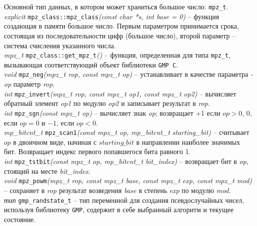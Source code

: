 \documentclass[a4paper,12pt]{article}
\begin{document}
	Основной тип данных, в котором может храниться большое число: \texttt{mpz\_t}.\\
	
	\textit{explicit} \texttt{mpz\_class::mpz\_class}\textit{(const char *s, int base = 0)} -- функция создающая в памяти большое число. Первым параметром принимается срока, состоящая из последовательности цифр (большое число), второй параметр -- система счисления указанного числа.\\
	
	\textit{mpz\_t} \texttt{mpz\_class::get\_mpz\_t}\textit{()} -- функция, определенная для типа \texttt{mpz\_t}, вызывающая соответствующий объект библиотеки \texttt{GMP C}.\\
	
	\textit{void} \texttt{mpz\_neg}\textit{(mpz\_t rop, const mpz\_t op)} -- устанавливает в качестве параметра \textit{-op} параметр \textit{rop}.\\
	
	\textit{int} \texttt{mpz\_invert}\textit{(mpz\_t rop, const mpz\_t op1, const mpz\_t op2)} -- вычисляет обратный элемент \textit{op1} по модулю \textit{op2} и записывает результат в \textit{rop.}\\
	
	\textit{int} \texttt{mpz\_sgn}\textit{(const mpz\_t op)} -- вычисляет знак \textit{op}; возвращает +1 если $op>0$, $0$, если $op=0$ и $-1$, если $op<0$.\\
	
	\textit{mp\_bitcnt\_t} \texttt{mpz\_scan1}\textit{(const mpz\_t op, mp\_bitcnt\_t starting\_bit)} -- считывает $op$ в двоичном виде, начиная с $starting\_bit$ в направлении наиболее значимых бит. Возвращает индекс первого попавшегося бита равного 1.\\
	
	\textit{int} \texttt{mpz\_tstbit}\textit{(const mpz\_t op, mp\_bitcnt\_t bit\_index)} -- возвращает бит в \textit{op}, стоящий на месте \textit{bit\_index}.\\
	
	\textit{void} \texttt{mpz\_powm}\textit{(mpz\_t rop, const mpz\_t base, const mpz\_t exp, const mpz\_t mod)} -- сохраняет в \textit{rop} результат возведения \textit{base} в степень \textit{exp} по модулю \textit{mod}.\\
	
	\textit{тип} \texttt{gmp\_randstate\_t} -- тип переменной для создания псевдослучайных чисел, используя библиотеку \texttt{GMP}, содержит в себе выбранный алгоритм и текущее состояние.\\
	
\end{document}
